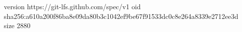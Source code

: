 version https://git-lfs.github.com/spec/v1
oid sha256:a610a200f86ba8e09da80b3c1042ef9be67f91533dc0c8e264a8339e2712ee3d
size 2880
